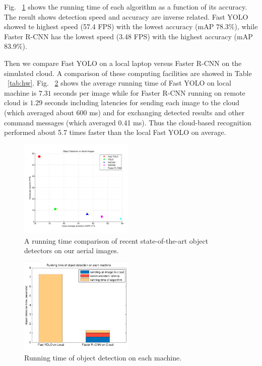 Fig. ~\ref{fig:compare_algorithm} shows the running time of each algorithm as a function of its accuracy. 
The result shows detection speed and accuracy are inverse related. Fast YOLO showed te highest speed (57.4 FPS) with the lowest accuracy (mAP $78.3\%$), while Faster R-CNN has the lowest speed (3.48 FPS) with the highest accuracy (mAP $83.9\%$).

Then we compare Fast YOLO on a local laptop versus Faster R-CNN on the simulated cloud. 
A comparison of these computing facilities are showed in Table ~\ref{tab:hw}. 
Fig. ~\ref{fig:bar_plot} shows the average running time of Fast YOLO on local machine is $7.31$ seconds per image while for Faster R-CNN running on remote cloud is $1.29$ seconds including latencies for sending each image to the cloud (which averaged about 600 ms) and for exchanging detected results and other command messages (which averaged 0.41 ms). Thus the cloud-based recognition performed about 5.7 times faster than the local Fast YOLO on average.

\begin{figure}[t]
\begin{center}
\includegraphics[width=0.489\textwidth]{figures/chapter2/drone_comparing_algorithms.pdf}
\end{center}
\caption{A running time comparison of recent state-of-the-art object detectors on our aerial images.}
\label{fig:compare_algorithm}
\end{figure}

\begin{figure}[t]
\begin{center}
\includegraphics[width=0.489\textwidth]{figures/chapter2/drone_running_time.pdf}
\end{center}
\caption{Running time of object detection on each machine.}
\label{fig:bar_plot}
\end{figure}

